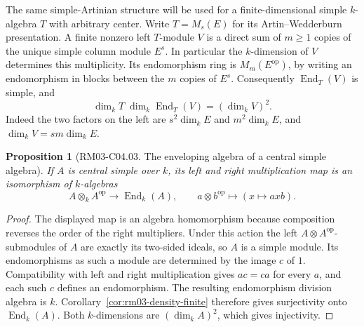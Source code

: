 \documentclass[11pt,oneside,openany]{book}
\newtheorem{proposition}[theorem]{Proposition}
\theoremstyle{definition}
\theoremstyle{remark}
\begin{document}
The same simple-Artinian structure will be used for a finite-dimensional
simple \(k\)-algebra \(T\) with arbitrary center. Write \(T=M_s(E)\)
for its Artin--Wedderburn presentation. A finite nonzero left
\(T\)-module \(V\) is a direct sum of \(m\geq 1\) copies of the
unique simple column module \(E^s\). In particular the
\(k\)-dimension of \(V\) determines this multiplicity. Its
endomorphism ring is \(M_m(E^{\mathrm{op}})\), by writing an
endomorphism in blocks between the \(m\) copies of \(E^s\).
Consequently \(\operatorname{End}_T(V)\) is simple, and
\begin{equation}
\label{eq:rm03-simple-end-dimension}
\dim_k T\;\dim_k\operatorname{End}_T(V)=(\dim_k V)^2.
\end{equation}
Indeed the two factors on the left are \(s^2\dim_k E\) and
\(m^2\dim_k E\), and \(\dim_k V=sm\dim_k E\).

\begin{proposition}[RM03-C04.03. The enveloping algebra of a central simple algebra]
\label{prop:rm03-enveloping}
If \(A\) is central simple over \(k\), its left and right multiplication
map is an isomorphism of \(k\)-algebras
\[
 A\otimes_k A^{\mathrm{op}}\longrightarrow \operatorname{End}_k(A),
 \qquad a\otimes b^{\mathrm{op}}\longmapsto (x\mapsto axb).
\]
\end{proposition}
\begin{proof}
The displayed map is an algebra homomorphism because composition
reverses the order of the right multipliers. Under this action the
left \(A\otimes A^{\mathrm{op}}\)-submodules of \(A\) are exactly its
two-sided ideals, so \(A\) is a simple module. Its endomorphisms as
such a module are determined by the image \(c\) of \(1\). Compatibility
with left and right multiplication gives \(ac=ca\) for every \(a\),
and each such \(c\) defines an endomorphism. The resulting endomorphism
division algebra is \(k\). Corollary~\ref{cor:rm03-density-finite} therefore
gives surjectivity onto \(\operatorname{End}_k(A)\). Both \(k\)-dimensions
are \((\dim_k A)^2\), which gives injectivity.
\end{proof}
\end{document}
